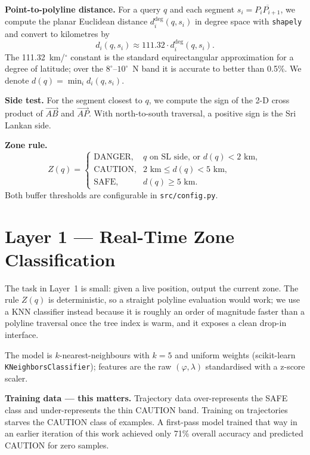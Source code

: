 \documentclass[conference]{IEEEtran}
\begin{document}
\textbf{Point-to-polyline distance.} For a query $q$ and each segment $s_i = \overline{P_i P_{i+1}}$, we compute the planar Euclidean distance $d_i^{\text{deg}}(q, s_i)$ in degree space with \texttt{shapely} and convert to kilometres by
\begin{equation}
d_i(q, s_i) \approx 111.32 \cdot d_i^{\text{deg}}(q, s_i).
\end{equation}
The 111.32~km/$^\circ$ constant is the standard equirectangular approximation for a degree of latitude; over the $8^\circ$--$10^\circ$~N band it is accurate to better than 0.5\%. We denote $d(q) = \min_i d_i(q, s_i)$.

\textbf{Side test.} For the segment closest to $q$, we compute the sign of the 2-D cross product of $\vec{AB}$ and $\vec{AP}$. With north-to-south traversal, a positive sign is the Sri Lankan side.

\textbf{Zone rule.}
\begin{equation}
Z(q) =
\begin{cases}
\text{DANGER}, & q \text{ on SL side, or } d(q) < 2\text{ km}, \\
\text{CAUTION}, & 2\text{ km} \le d(q) < 5\text{ km}, \\
\text{SAFE}, & d(q) \ge 5\text{ km}.
\end{cases}
\end{equation}
Both buffer thresholds are configurable in \texttt{src/config.py}.

\section{Layer 1 --- Real-Time Zone Classification}\label{sec:layer1}

The task in Layer~1 is small: given a live position, output the current zone. The rule $Z(q)$ is deterministic, so a straight polyline evaluation would work; we use a KNN classifier instead because it is roughly an order of magnitude faster than a polyline traversal once the tree index is warm, and it exposes a clean drop-in interface.

The model is $k$-nearest-neighbours with $k = 5$ and uniform weights (scikit-learn \texttt{KNeighborsClassifier}); features are the raw $(\varphi, \lambda)$ standardised with a z-score scaler.

\textbf{Training data --- this matters.} Trajectory data over-represents the SAFE class and under-represents the thin CAUTION band. Training on trajectories starves the CAUTION class of examples. A first-pass model trained that way in an earlier iteration of this work achieved only 71\% overall accuracy and predicted CAUTION for zero samples.
\end{document}
